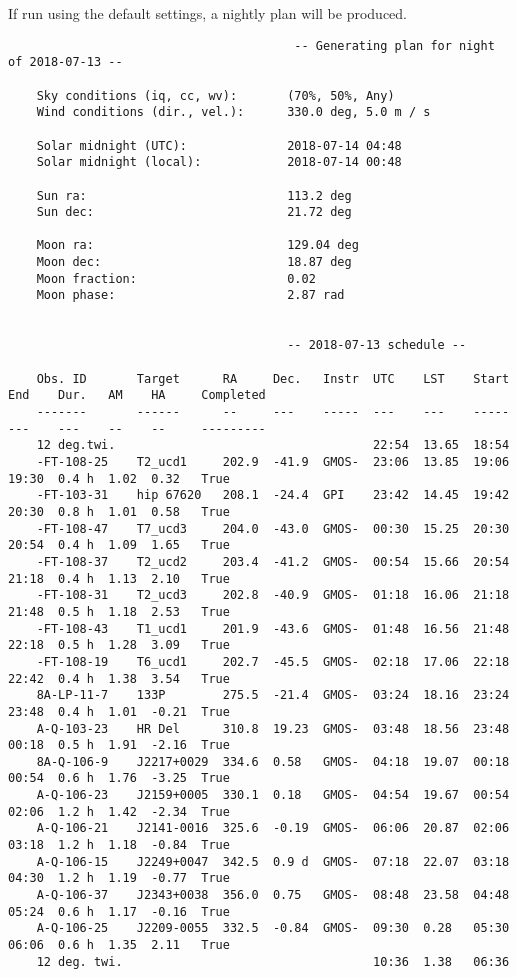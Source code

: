 \documentclass{article}
\begin{document}
If run using the default settings, a nightly plan will be produced.

\begin{lstlisting}
										-- Generating plan for night of 2018-07-13 --
	
	Sky conditions (iq, cc, wv):       (70%, 50%, Any)
	Wind conditions (dir., vel.):      330.0 deg, 5.0 m / s
	
	Solar midnight (UTC):              2018-07-14 04:48
	Solar midnight (local):            2018-07-14 00:48
	
	Sun ra:                            113.2 deg
	Sun dec:                           21.72 deg
	
	Moon ra:                           129.04 deg
	Moon dec:                          18.87 deg
	Moon fraction:                     0.02
	Moon phase:                        2.87 rad
	
	
	                                   -- 2018-07-13 schedule --
	
	Obs. ID       Target      RA     Dec.   Instr  UTC    LST    Start  End    Dur.   AM    HA     Completed 
	-------       ------      --     ---    -----  ---    ---    -----  ---    ---    --    --     --------- 
	12 deg.twi.                                    22:54  13.65  18:54                                       
	-FT-108-25    T2_ucd1     202.9  -41.9  GMOS-  23:06  13.85  19:06  19:30  0.4 h  1.02  0.32   True      
	-FT-103-31    hip 67620   208.1  -24.4  GPI    23:42  14.45  19:42  20:30  0.8 h  1.01  0.58   True      
	-FT-108-47    T7_ucd3     204.0  -43.0  GMOS-  00:30  15.25  20:30  20:54  0.4 h  1.09  1.65   True      
	-FT-108-37    T2_ucd2     203.4  -41.2  GMOS-  00:54  15.66  20:54  21:18  0.4 h  1.13  2.10   True      
	-FT-108-31    T2_ucd3     202.8  -40.9  GMOS-  01:18  16.06  21:18  21:48  0.5 h  1.18  2.53   True      
	-FT-108-43    T1_ucd1     201.9  -43.6  GMOS-  01:48  16.56  21:48  22:18  0.5 h  1.28  3.09   True      
	-FT-108-19    T6_ucd1     202.7  -45.5  GMOS-  02:18  17.06  22:18  22:42  0.4 h  1.38  3.54   True      
	8A-LP-11-7    133P        275.5  -21.4  GMOS-  03:24  18.16  23:24  23:48  0.4 h  1.01  -0.21  True      
	A-Q-103-23    HR Del      310.8  19.23  GMOS-  03:48  18.56  23:48  00:18  0.5 h  1.91  -2.16  True      
	8A-Q-106-9    J2217+0029  334.6  0.58   GMOS-  04:18  19.07  00:18  00:54  0.6 h  1.76  -3.25  True      
	A-Q-106-23    J2159+0005  330.1  0.18   GMOS-  04:54  19.67  00:54  02:06  1.2 h  1.42  -2.34  True      
	A-Q-106-21    J2141-0016  325.6  -0.19  GMOS-  06:06  20.87  02:06  03:18  1.2 h  1.18  -0.84  True      
	A-Q-106-15    J2249+0047  342.5  0.9 d  GMOS-  07:18  22.07  03:18  04:30  1.2 h  1.19  -0.77  True      
	A-Q-106-37    J2343+0038  356.0  0.75   GMOS-  08:48  23.58  04:48  05:24  0.6 h  1.17  -0.16  True      
	A-Q-106-25    J2209-0055  332.5  -0.84  GMOS-  09:30  0.28   05:30  06:06  0.6 h  1.35  2.11   True      
	12 deg. twi.                                   10:36  1.38   06:36                                       
\end{lstlisting}
\end{document}

